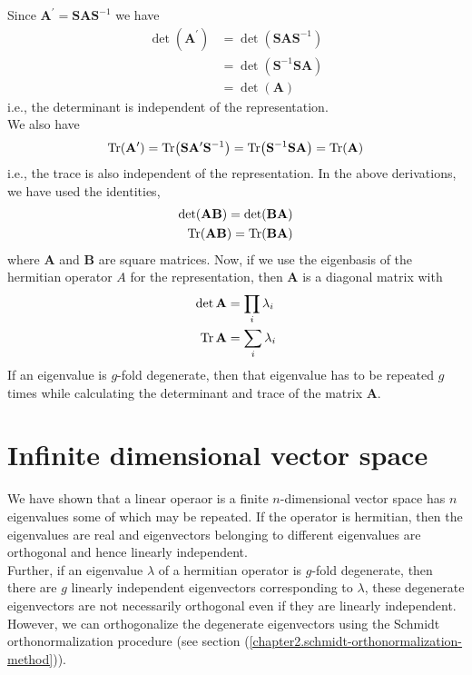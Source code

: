 	Since $\mathbf{A}^\prime = \mathbf{S} \mathbf{A} \mathbf{S}^{-1}$ we have 
	\begin{eqnarray}
		\det(\mathbf{A}^\prime) 
		&= \det(\mathbf{S} \mathbf{A} \mathbf{S}^{-1}) \nonumber \\
		&= \det(\mathbf{S}^{-1}\mathbf{S} \mathbf{A} ) \nonumber \\
		&= \det(\mathbf{A})
	\end{eqnarray}
	i.e., the determinant is independent of the representation.\\
	
	We also have
	\begin{equation}
		\Tr (\mathbf{A}^\prime) = \Tr (\mathbf{S}\mathbf{A}^\prime\mathbf{S}^{-1})=\Tr(\mathbf{S}^{-1}\mathbf{S} \mathbf{A}) = \Tr (\mathbf{A})
	\end{equation}
	i.e., the trace is also independent of the representation. In the above derivations, we have used the identities,
	\begin{eqnarray}
		\det( \mathbf{A}\mathbf{B}) = \det(\mathbf{B}\mathbf{A}) \\
		\Tr( \mathbf{A}\mathbf{B}) = \Tr(\mathbf{B}\mathbf{A})
	\end{eqnarray}
	where $\mathbf{A}$ and $\mathbf{B}$ are square matrices. Now, if we use the eigenbasis of the hermitian operator $A$ for the representation, then $\mathbf{A}$ is a diagonal matrix with
	\begin{eqnarray}
		\det \mathbf{A} &= \prod_i \lambda_i \\
		\Tr \mathbf{A} &= \sum_i \lambda_i 
	\end{eqnarray}
	If an eigenvalue is $g$-fold degenerate, then that eigenvalue has to be repeated $g$ times while calculating the determinant and trace of the matrix $\mathbf{A}$.\\
	
	
	
	\section{Infinite dimensional vector space}
	We have shown that a linear operaor is a finite $n$-dimensional vector space has $n$ eigenvalues some of which may be repeated. If the operator is hermitian, then the eigenvalues are real and eigenvectors belonging to different eigenvalues are orthogonal and hence linearly independent.\\
	
	Further, if an eigenvalue $\lambda$ of a hermitian operator is $g$-fold degenerate, then there are $g$ linearly independent eigenvectors corresponding to $\lambda$, these degenerate eigenvectors are not necessarily orthogonal even if they are linearly independent. However, we can orthogonalize the degenerate eigenvectors using the Schmidt orthonormalization procedure (see section (\ref{chapter2.schmidt-orthonormalization-method})). \\
	
